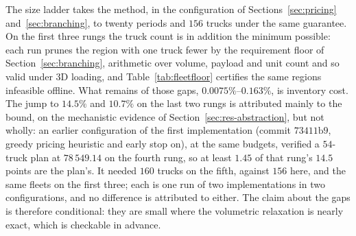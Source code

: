 The size ladder takes the method, in the configuration of
Sections~\ref{sec:pricing} and~\ref{sec:branching}, to twenty periods
and $156$ trucks under the same guarantee. On the first three rungs the
truck count is in addition the minimum possible: each run prunes the
region with one truck fewer by the requirement floor of
Section~\ref{sec:branching}, arithmetic over volume, payload and unit
count and so valid under 3D loading, and Table~\ref{tab:fleetfloor}
certifies the same regions infeasible offline. What remains of those
gaps, $0.0075\%$--$0.163\%$, is inventory cost. The jump to $14.5\%$
and $10.7\%$ on the last two rungs is attributed mainly to the bound,
on the mechanistic evidence of Section~\ref{sec:res-abstraction}, but
not wholly: an earlier configuration of the first implementation
(commit $73411\mathrm{b}9$, greedy pricing heuristic and early stop
on), at the same budgets, verified a $54$-truck plan at $78\,549.14$ on
the fourth rung, so at least $1.45$ of that rung's $14.5$ points are
the plan's. It needed $160$ trucks on the fifth, against $156$ here,
and the same fleets on the first three; each is one run of two
implementations in two configurations, and no difference is attributed
to either. The claim about the gaps is therefore conditional: they are
small where the volumetric relaxation is nearly exact, which is
checkable in advance.

